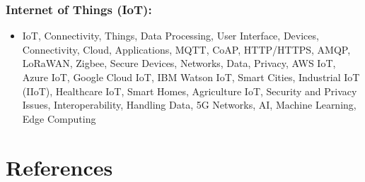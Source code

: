 \documentclass[
  letterpaper,
  DIV=11,
  numbers=noendperiod]{scrreprt}
\providecommand{\tightlist}{%
  \setlength{\itemsep}{0pt}\setlength{\parskip}{0pt}}\usepackage{longtable,booktabs,array}
\begin{document}
\subsection{Internet of Things (IoT):}\label{internet-of-things-iot-2}

\begin{itemize}
\tightlist
\item
  IoT, Connectivity, Things, Data Processing, User Interface, Devices,
  Connectivity, Cloud, Applications, MQTT, CoAP, HTTP/HTTPS, AMQP,
  LoRaWAN, Zigbee, Secure Devices, Networks, Data, Privacy, AWS IoT,
  Azure IoT, Google Cloud IoT, IBM Watson IoT, Smart Cities, Industrial
  IoT (IIoT), Healthcare IoT, Smart Homes, Agriculture IoT, Security and
  Privacy Issues, Interoperability, Handling Data, 5G Networks, AI,
  Machine Learning, Edge Computing
\end{itemize}


\chapter*{References}\label{references-5}

\end{document}
